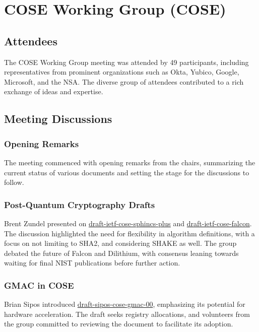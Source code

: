 \documentclass{article}
\begin{document}
\newpage

\section{COSE Working Group (COSE)}

\subsection{Attendees}
The COSE Working Group meeting was attended by 49 participants, including representatives from prominent organizations such as Okta, Yubico, Google, Microsoft, and the NSA. The diverse group of attendees contributed to a rich exchange of ideas and expertise.

\subsection{Meeting Discussions}

\subsubsection{Opening Remarks}
The meeting commenced with opening remarks from the chairs, summarizing the current status of various documents and setting the stage for the discussions to follow.

\subsubsection{Post-Quantum Cryptography Drafts}
Brent Zundel presented on \href{https://datatracker.ietf.org/doc/html/draft-ietf-cose-sphincs-plus}{draft-ietf-cose-sphincs-plus} and \href{https://datatracker.ietf.org/doc/html/draft-ietf-cose-falcon}{draft-ietf-cose-falcon}. The discussion highlighted the need for flexibility in algorithm definitions, with a focus on not limiting to SHA2, and considering SHAKE as well. The group debated the future of Falcon and Dilithium, with consensus leaning towards waiting for final NIST publications before further action.

\subsubsection{GMAC in COSE}
Brian Sipos introduced \href{https://datatracker.ietf.org/doc/html/draft-sipos-cose-gmac-00}{draft-sipos-cose-gmac-00}, emphasizing its potential for hardware acceleration. The draft seeks registry allocations, and volunteers from the group committed to reviewing the document to facilitate its adoption.
\end{document}
